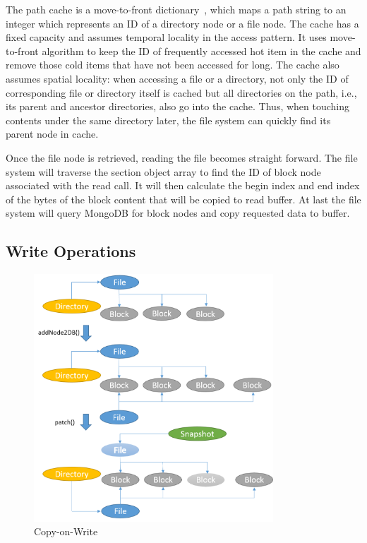     The path cache is a move-to-front dictionary~\cite{mtf}, which maps a path string to an integer which represents an ID of a directory node or a file node. The cache has a fixed capacity and assumes temporal locality in the access pattern. It uses move-to-front algorithm to keep the ID of frequently accessed hot item in the cache and remove those cold items that have not been accessed for long. The cache also assumes spatial locality: when accessing a file or a directory, not only the ID of corresponding file or directory itself is cached but all directories on the path, i.e., its parent and ancestor directories, also go into the cache. Thus, when touching contents under the same directory later, the file system can quickly find its parent node in cache.

    Once the file node is retrieved, reading the file becomes straight forward. The file system will traverse the section object array to find the ID of block node associated with the read call. It will then calculate the begin index and end index of the bytes of the block content that will be copied to read buffer. At last the file system will query MongoDB for block nodes and copy requested data to buffer.

\subsection{Write Operations}

\begin{figure}[t]
\centering
\includegraphics[width=0.8\textwidth]{Chapter-3/figs/fig10.png}
\caption{Copy-on-Write}
\label{fig:cow}
\end{figure}

